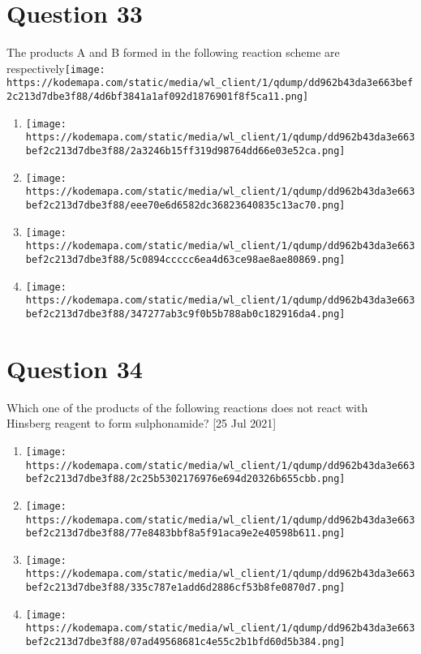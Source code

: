 \documentclass{article}
\begin{document}
\section*{Question 33}
The products A and B formed in the following reaction scheme are respectively\texttt{[image: https://kodemapa.com/static/media/wl\_client/1/qdump/dd962b43da3e663bef2c213d7dbe3f88/4d6bf3841a1af092d1876901f8f5ca11.png]}\newline\newline
\begin{enumerate}[label=(\alph*)]
\item \texttt{[image: https://kodemapa.com/static/media/wl\_client/1/qdump/dd962b43da3e663bef2c213d7dbe3f88/2a3246b15ff319d98764dd66e03e52ca.png]}
\item \texttt{[image: https://kodemapa.com/static/media/wl\_client/1/qdump/dd962b43da3e663bef2c213d7dbe3f88/eee70e6d6582dc36823640835c13ac70.png]}
\item \texttt{[image: https://kodemapa.com/static/media/wl\_client/1/qdump/dd962b43da3e663bef2c213d7dbe3f88/5c0894ccccc6ea4d63ce98ae8ae80869.png]}
\item \texttt{[image: https://kodemapa.com/static/media/wl\_client/1/qdump/dd962b43da3e663bef2c213d7dbe3f88/347277ab3c9f0b5b788ab0c182916da4.png]}
\end{enumerate}
\newpage
\section*{Question 34}
Which one of the products of the following reactions does not react with Hinsberg reagent to form sulphonamide? [25 Jul 2021]
\begin{enumerate}[label=(\alph*)]
\item \texttt{[image: https://kodemapa.com/static/media/wl\_client/1/qdump/dd962b43da3e663bef2c213d7dbe3f88/2c25b5302176976e694d20326b655cbb.png]}
\item \texttt{[image: https://kodemapa.com/static/media/wl\_client/1/qdump/dd962b43da3e663bef2c213d7dbe3f88/77e8483bbf8a5f91aca9e2e40598b611.png]}
\item \texttt{[image: https://kodemapa.com/static/media/wl\_client/1/qdump/dd962b43da3e663bef2c213d7dbe3f88/335c787e1add6d2886cf53b8fe0870d7.png]}
\item \texttt{[image: https://kodemapa.com/static/media/wl\_client/1/qdump/dd962b43da3e663bef2c213d7dbe3f88/07ad49568681c4e55c2b1bfd60d5b384.png]}
\end{enumerate}
\newpage
\end{document}
